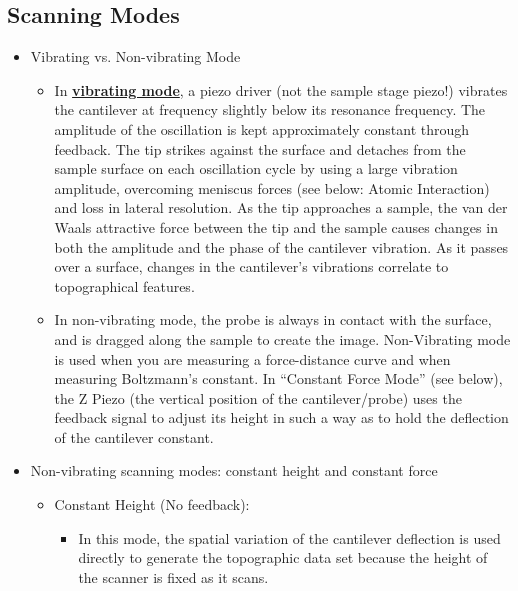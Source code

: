 \documentclass{../lab}
\begin{document}
\subsection{Scanning Modes}

\begin{itemize}
    \item Vibrating vs. Non-vibrating Mode

    \begin{itemize}
        \item In \href{http://experimentationlab.berkeley.edu/sites/default/files/AFMImages/7.2.\%20tip\%20sample\%20Vibrating.flv\_converted.mp4}{\textbf{vibrating mode}}, a piezo driver (not the sample stage piezo!) vibrates the cantilever at frequency slightly below its resonance frequency. The amplitude of the oscillation is kept approximately constant through feedback.  The tip strikes against the surface and detaches from the sample surface on each oscillation cycle by using a large vibration amplitude, overcoming meniscus forces (see below: Atomic Interaction) and loss in lateral resolution.  As the tip approaches a sample, the van der Waals attractive force between the tip and the sample causes changes in both the amplitude and the phase of the cantilever vibration.  As it passes over a surface, changes in the cantilever's vibrations correlate to topographical features.

        \item In non-vibrating mode, the probe is always in contact with the surface, and is dragged along the sample to create the image.  Non-Vibrating mode is used when you are measuring a force-distance curve and when measuring Boltzmann's constant. In ``Constant Force Mode'' (see below), the Z Piezo (the vertical position of the cantilever/probe) uses the feedback signal to adjust its height in such a way as to hold the deflection of the cantilever constant.
    \end{itemize}

    \item Non-vibrating scanning modes: constant height and constant force

    \begin{itemize}
        \item Constant Height (No feedback):

        \begin{itemize}
            \item In this mode, the spatial variation of the cantilever deflection is used directly to generate the topographic data set because the height of the scanner is fixed as it scans.


\end{itemize}
\end{itemize}
\end{itemize}
\end{document}
